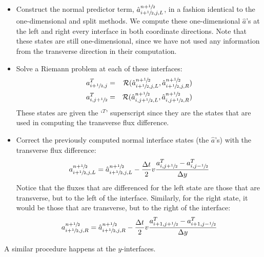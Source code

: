 \begin{itemize}
\item Construct the normal predictor term, $\hat{a}_{i+{\sfrac{1}{2}},j,L}^{n+{\sfrac{1}{2}}}$,
in a fashion identical to the one-dimensional and split methods.  We
compute these one-dimensional $\hat{a}$'s at the left and right every
interface in both coordinate directions.  Note that these states are
still one-dimensional, since we have not used any information from the
transverse direction in their computation.

\item Solve a Riemann problem at each of these interfaces:
\begin{eqnarray}
a^T_{i+{\sfrac{1}{2}},j} &=& \mathcal{R}(\hat{a}_{i+{\sfrac{1}{2}},j,L}^{n+{\sfrac{1}{2}}},
                              \hat{a}_{i+{\sfrac{1}{2}},j,R}^{n+{\sfrac{1}{2}}}) \\
a^T_{i,j+{\sfrac{1}{2}}} &=& \mathcal{R}(\hat{a}_{i,j+{\sfrac{1}{2}},L}^{n+{\sfrac{1}{2}}},
                              \hat{a}_{i,j+{\sfrac{1}{2}},R}^{n+{\sfrac{1}{2}}}) \\
\end{eqnarray}
These states are given the `$^T$' superscript since they are the states
that are used in computing the transverse flux difference.

\item Correct the
previously computed normal interface states (the $\hat{a}$'s) with
the transverse flux difference:
\begin{equation}
a_{i+{\sfrac{1}{2}},j,L}^{n+{\sfrac{1}{2}}} = \hat{a}_{i+{\sfrac{1}{2}},j,L}^{n+{\sfrac{1}{2}}}
   - \frac{\Delta t}{2} v \frac{a^T_{i,j+{\sfrac{1}{2}}} - a^T_{i,j-{\sfrac{1}{2}}}}{\Delta y}
\end{equation}
Notice that the
fluxes that are differenced for the left state are those that are
transverse, but to the left of the interface.  Similarly, for the
right state, it would be those that are transverse, but to the right
of the interface:
\begin{equation}
a_{i+{\sfrac{1}{2}},j,R}^{n+{\sfrac{1}{2}}} = \hat{a}_{i+{\sfrac{1}{2}},j,R}^{n+{\sfrac{1}{2}}}
   - \frac{\Delta t}{2} v \frac{a^T_{i+1,j+{\sfrac{1}{2}}} - a^T_{i+1,j-{\sfrac{1}{2}}}}{\Delta y}
\end{equation}
\end{itemize}
A similar procedure happens at the $y$-interfaces.


